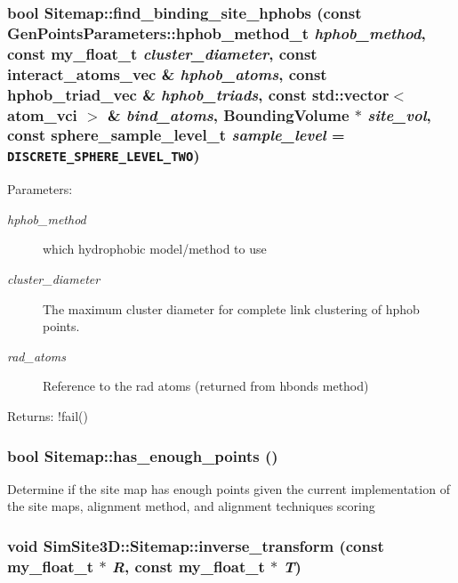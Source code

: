 \subsubsection{\setlength{\rightskip}{0pt plus 5cm}bool Sitemap::find\_\-binding\_\-site\_\-hphobs (const \bf{Gen\-Points\-Parameters::hphob\_\-method\_\-t} {\em hphob\_\-method}, const my\_\-float\_\-t {\em cluster\_\-diameter}, const interact\_\-atoms\_\-vec \& {\em hphob\_\-atoms}, const hphob\_\-triad\_\-vec \& {\em hphob\_\-triads}, const std::vector$<$ atom\_\-vci $>$ \& {\em bind\_\-atoms}, \bf{Bounding\-Volume} $\ast$ {\em site\_\-vol}, const sphere\_\-sample\_\-level\_\-t {\em sample\_\-level} = {\tt DISCRETE\_\-SPHERE\_\-LEVEL\_\-TWO})\hspace{0.3cm}{\tt  [private]}}\label{classSimSite3D_1_1Sitemap_955ee3f2bcb9a0853c49c98f9664310b}


\begin{Desc}
\item[Parameters:]
\begin{description}
\item[{\em hphob\_\-method}]which hydrophobic model/method to use \item[{\em cluster\_\-diameter}]The maximum cluster diameter for complete link clustering of hphob points. \item[{\em rad\_\-atoms}]Reference to the rad atoms (returned from hbonds method) \end{description}
\end{Desc}
\begin{Desc}
\item[Returns:]!fail() \end{Desc}
\subsubsection{\setlength{\rightskip}{0pt plus 5cm}bool Sitemap::has\_\-enough\_\-points ()}\label{classSimSite3D_1_1Sitemap_e9d2433452ba04908e7ef43cbe7d8c3c}


Determine if the site map has enough points given the current implementation of the site maps, alignment method, and alignment techniques scoring 
\subsubsection{\setlength{\rightskip}{0pt plus 5cm}void SimSite3D::Sitemap::inverse\_\-transform (const my\_\-float\_\-t $\ast$ {\em R}, const my\_\-float\_\-t $\ast$ {\em T})\hspace{0.3cm}{\tt  [inline]}}\label{classSimSite3D_1_1Sitemap_9923d897faab8e6b015908311241ac3a}


